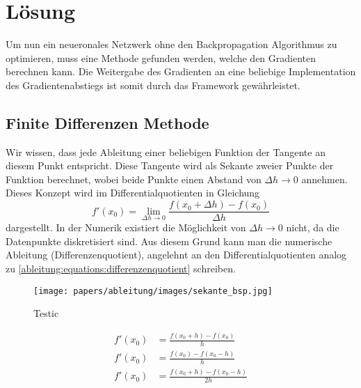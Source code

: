 %
%
%
\section{Lösung
\label{ableitung:section:loesung}}
Um nun ein neueronales Netzwerk ohne den Backpropagation Algorithmus zu optimieren, muss eine Methode gefunden werden, welche den Gradienten berechnen kann. Die Weitergabe des Gradienten an eine beliebige Implementation des Gradientenabstiegs ist somit durch das Framework gewährleistet.
\subsection{Finite Differenzen Methode}
Wir wissen, dass jede Ableitung einer beliebigen Funktion der Tangente an diesem Punkt entspricht. Diese Tangente wird als Sekante zweier Punkte der Funktion berechnet, wobei beide Punkte einen Abstand von $\Delta h \rightarrow 0$ annehmen. Dieses Konzept wird im Differentialquotienten in Gleichung
\begin{equation}
f'(x_0) = \lim_{{\Delta h} \rightarrow 0} \frac{f(x_0+\Delta h) - f(x_0)}{\Delta h}
\label{ableitung:equations:differentialquotient}
\end{equation}
dargestellt.
In der Numerik existiert die Möglichkeit von $\Delta h \rightarrow 0$ nicht, da die Datenpunkte diskretisiert sind. Aus diesem Grund kann man die numerische Ableitung (Differenzenquotient), angelehnt an den Differentialquotienten analog zu \ref{ableitung:equations:differenzenquotient} schreiben.

\begin{figure}
	\begin{center}
		\texttt{[image: papers/ableitung/images/sekante\_bsp.jpg]}
		\caption{Testic}
		\label{ableitung:fig:ableitung_bsp}
	\end{center}
\end{figure}

\begin{equation}
\begin{split}
f'(x_0) &= \frac{f(x_0 + h) - f(x_0)}{h} \\
f'(x_0) &= \frac{f(x_0) - f(x_0 - h)}{h} \\
f'(x_0) &= \frac{f(x_0 + h) - f(x_0 - h)}{2h} \\
\end{split}
\label{ableitung:equations:differenzenquotient}
\end{equation}


